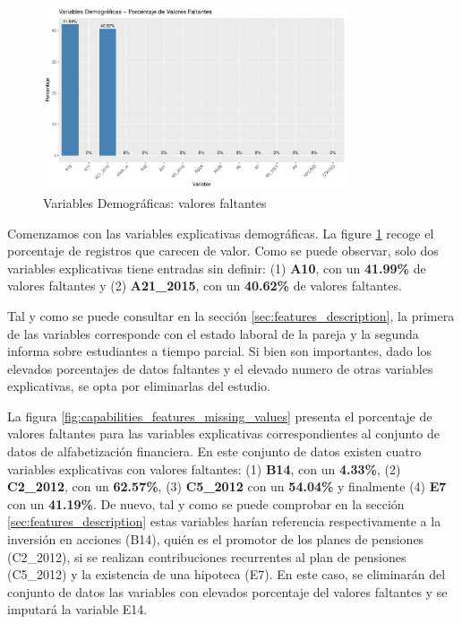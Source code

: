 \documentclass[a4paper, 11pt]{article}
\begin{document}
\begin{figure}[ht]
    \centering
    \includegraphics[width=0.8\textwidth]{images/Demographic_Features__Missing_Values.pdf} 
    \caption{Variables Demográficas: valores faltantes}
    \label{fig:demographic_features_missing_values}
\end{figure}

Comenzamos con las variables explicativas demográficas. La figure \ref{fig:demographic_features_missing_values}
recoge el porcentaje de registros que carecen de valor. Como se puede observar, solo dos 
variables explicativas tiene entradas sin definir: (1) \textbf{A10}, con un
\textbf{41.99\%} de valores faltantes y (2) \textbf{A21\_2015}, con un \textbf{40.62\%} de 
valores faltantes. 

Tal y como se puede consultar en la sección \ref{sec:features_description}, la 
primera de las variables corresponde con el estado laboral de la pareja y la segunda informa 
sobre estudiantes a tiempo parcial. Si bien son importantes, dado los elevados porcentajes de
datos faltantes y el elevado numero de otras variables explicativas, se opta por eliminarlas
del estudio.

La figura \ref{fig:capabilities_features_missing_values} presenta el porcentaje de valores 
faltantes para las variables explicativas correspondientes al conjunto de datos de alfabetización
financiera. En este conjunto de datos existen cuatro variables explicativas con valores faltantes:
(1) \textbf{B14}, con un \textbf{4.33\%}, (2) \textbf{C2\_2012}, con un \textbf{62.57\%}, (3) 
\textbf{C5\_2012} con un \textbf{54.04\%} y finalmente (4) \textbf{E7} con un \textbf{41.19\%}. De
nuevo, tal y como se puede comprobar en la sección \ref{sec:features_description} estas variables harían
referencia respectivamente a la inversión en acciones (B14), quién es el promotor de los planes de
pensiones (C2\_2012), si se realizan contribuciones recurrentes al plan de pensiones (C5\_2012) y
la existencia de una hipoteca (E7). En este caso, se eliminarán del conjunto de datos las
variables con elevados porcentaje del valores faltantes y se imputará la variable E14.
\end{document}
